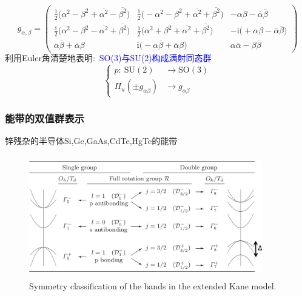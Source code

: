 {{{\begin{displaymath}
	g_{\alpha,\beta}=
	\begin{pmatrix}
		\frac12\big(\alpha^2-\beta^2+\overline{\alpha^2}-\overline{\beta^2}\big) &\frac{\mathrm{i}}2\big(-\alpha^2-\beta^2+\overline{\alpha^2}+\overline{\beta^2}\big) &-\alpha\beta-\overline{\alpha}\overline{\beta}\\
		\frac{\mathrm{i}}2\big(\alpha^2-\beta^2-\overline{\alpha^2}+\overline{\beta^2}\big) &\frac12\big(\alpha^2+\beta^2+\overline{\alpha^2}+\overline{\beta^2}\big) &-\mathrm{i}\big(+\alpha\beta-\overline{\alpha}\overline{\beta}\big)\\
		\alpha\overline{\beta}+\overline{\alpha}\beta &\mathrm{i}\big(-\alpha\overline{\beta}+\overline{\alpha}\beta\big) &\alpha\overline{\alpha}-\beta\overline{\beta}
	\end{pmatrix}
\end{displaymath}
利用\textrm{Euler}角清楚地表明:~\textcolor{blue}{\textrm{SO(3)}与\textrm{SU(2)}构成满射同态群}
\begin{displaymath}
	\left\{
		\begin{aligned}
			p:~\mathrm{SU(2)}&\rightarrow \mathrm{SO(3)}\\
			\Pi_u(\pm g_{\alpha\beta})&\rightarrow g_{\alpha\beta}
		\end{aligned}
		\right.
\end{displaymath}
}}
}

\frame
{
	\frametitle{能带的双值群表示}
	锌残杂的半导体\textrm{Si},\textrm{Ge},\textrm{GaAs},\textrm{CdTe},\textrm{HgTe}的能带
	\begin{figure}[h!]
\centering
\vspace*{-0.10in}
\includegraphics[height=2.1in,width=4.00in,viewport=0 0 1490 730,clip]{Figures/SOC_double-group.png}
\caption{\tiny \textrm{Symmetry classification of the bands in the extended Kane model.}}%
\label{Fig:Double-Group}
\end{figure}
}

